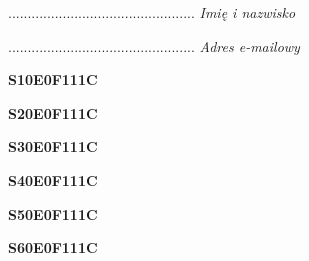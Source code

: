 \begin{turn}{90}\begin{minipage}{\linewidth} \vspace{20mm} ................................................  \textit{Imię i nazwisko}\end{minipage}\end{turn}

\begin{turn}{90}\begin{minipage}{\linewidth} \vspace{20mm} ................................................  \textit{Adres e-mailowy}\end{minipage}\end{turn}

\begin{turn}{90}\huge \begin{minipage}{\linewidth} \vspace{10mm}\textbf{S10E0F111C}\end{minipage}\end{turn}

\begin{turn}{90}\huge \begin{minipage}{\linewidth} \vspace{10mm}\textbf{S20E0F111C}\end{minipage}\end{turn}

\begin{turn}{90}\huge \begin{minipage}{\linewidth} \vspace{10mm}\textbf{S30E0F111C}\end{minipage}\end{turn}

\begin{turn}{90}\huge \begin{minipage}{\linewidth} \vspace{10mm}\textbf{S40E0F111C}\end{minipage}\end{turn}

\begin{turn}{90}\huge \begin{minipage}{\linewidth} \vspace{10mm}\textbf{S50E0F111C}\end{minipage}\end{turn}

\begin{turn}{90}\huge \begin{minipage}{\linewidth} \vspace{10mm}\textbf{S60E0F111C}\end{minipage}\end{turn}


